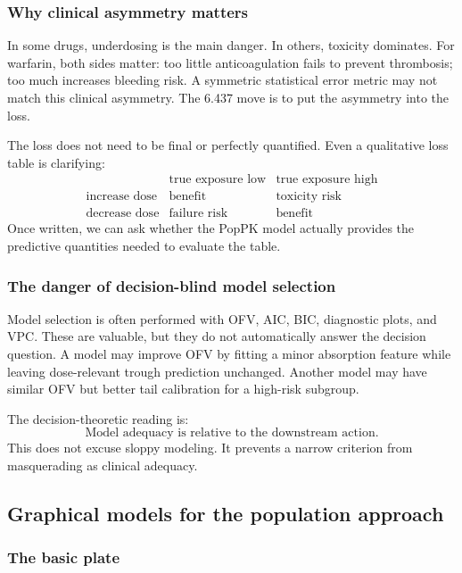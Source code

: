 \subsubsection*{Why clinical asymmetry matters}

In some drugs, underdosing is the main danger.  In others, toxicity dominates.  For warfarin, both sides matter: too little anticoagulation fails to prevent thrombosis; too much increases bleeding risk.  A symmetric statistical error metric may not match this clinical asymmetry.  The 6.437 move is to put the asymmetry into the loss.

The loss does not need to be final or perfectly quantified.  Even a qualitative loss table is clarifying:
\[
  \begin{array}{c|cc}
  & \text{true exposure low} & \text{true exposure high}\\ \hline
  \text{increase dose} & \text{benefit} & \text{toxicity risk}\\
  \text{decrease dose} & \text{failure risk} & \text{benefit}
  \end{array}
\]
Once written, we can ask whether the PopPK model actually provides the predictive quantities needed to evaluate the table.

\subsubsection*{The danger of decision-blind model selection}

Model selection is often performed with OFV, AIC, BIC, diagnostic plots, and VPC.  These are valuable, but they do not automatically answer the decision question.  A model may improve OFV by fitting a minor absorption feature while leaving dose-relevant trough prediction unchanged.  Another model may have similar OFV but better tail calibration for a high-risk subgroup.

The decision-theoretic reading is:
\[
  \text{Model adequacy is relative to the downstream action.}
\]
This does not excuse sloppy modeling.  It prevents a narrow criterion from masquerading as clinical adequacy.

\subsection{Graphical models for the population approach}

\subsubsection*{The basic plate}

